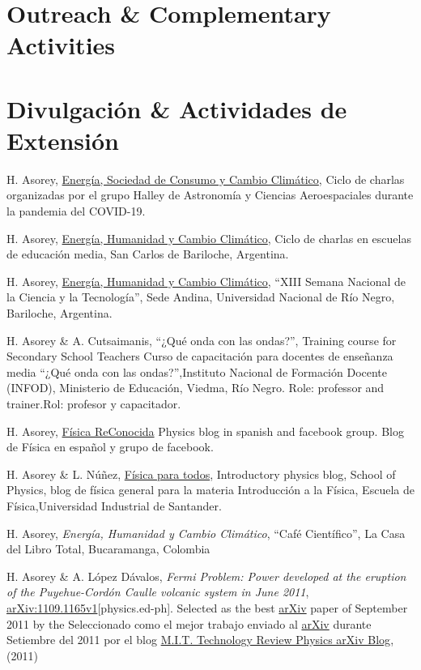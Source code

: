 \ifeng
\section*{Outreach \& Complementary Activities}
\else
\section*{Divulgación \& Actividades de Extensión}
\fi
\noindent

H. Asorey, \href{https://www.youtube.com/watch?v=i4sUhccG6ZI}{Energía, Sociedad de Consumo y Cambio Climático}, Ciclo de charlas organizadas por el grupo Halley de Astronomía y Ciencias Aeroespaciales durante la pandemia del COVID-19.

H. Asorey, \href{}{Energía, Humanidad y Cambio Climático}, Ciclo de charlas en escuelas de educación media, San Carlos de Bariloche, Argentina.

H. Asorey, \href{http://www.semanadelaciencia.mincyt.gob.ar/}{Energía, Humanidad y Cambio Climático}, ``XIII Semana Nacional de la Ciencia y la Tecnología'', Sede Andina, Universidad Nacional de Río Negro, Bariloche, Argentina.

H. Asorey \& A. Cutsaimanis, \ifeng ``¿Qué onda con las ondas?'', Training course for Secondary School Teachers \else Curso de capacitación para docentes de enseñanza media ``¿Qué onda con las ondas?'',\fi Instituto Nacional de Formación Docente (INFOD), Ministerio de Educación, Viedma, Río Negro. \ifeng Role: professor and trainer.\else Rol: profesor y capacitador.\fi

H. Asorey, \href{http://fisicareconocida.blogspot.com}{Física ReConocida} \ifeng Physics blog in spanish and facebook group. \else Blog de Física en español y grupo de facebook.\fi 

 H. Asorey \& L. Núñez, \href{http://halley.uis.edu.co/fisica_para_todos}{Física para todos}, \ifeng Introductory physics blog, School of Physics, \else blog de física general para la materia Introducción a la Física, Escuela de Física,\fi Universidad Industrial de Santander. 

H. Asorey, {\it{Energía, Humanidad y Cambio Climático}}, ``Café Científico'', La Casa del Libro Total, Bucaramanga, Colombia

H. Asorey \& A. López Dávalos, {\emph{Fermi Problem: Power
developed at the eruption of the Puyehue-Cordón Caulle volcanic system in June
2011}}, \href{http://arxiv.org/abs/1109.1165}{arXiv:1109.1165v1}[physics.ed-ph]. \ifeng
Selected as the best \href{http://arxiv.org}{arXiv} paper of September 2011 by the
\else
Seleccionado como el mejor trabajo enviado al \href{http://arxiv.org}{arXiv} durante Setiembre del 2011 por el blog
\fi
\href{http://www.technologyreview.com/blog/arxiv/27140/}{M.I.T. Technology
Review Physics arXiv Blog}, (2011)

